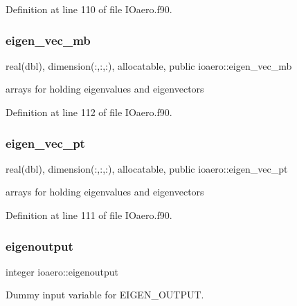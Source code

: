Definition at line 110 of file I\+Oaero.\+f90.

\mbox{\label{namespaceioaero_a0d150f0b81c676515b90fcf83d7ff8c3}} 
\subsubsection{\texorpdfstring{eigen\+\_\+vec\+\_\+mb}{eigen\_vec\_mb}}
{\footnotesize\ttfamily real(dbl), dimension(\+:,\+:,\+:), allocatable, public ioaero\+::eigen\+\_\+vec\+\_\+mb}



arrays for holding eigenvalues and eigenvectors 



Definition at line 112 of file I\+Oaero.\+f90.

\mbox{\label{namespaceioaero_a53e09660909f61713dee3887a3adc1ec}} 
\subsubsection{\texorpdfstring{eigen\+\_\+vec\+\_\+pt}{eigen\_vec\_pt}}
{\footnotesize\ttfamily real(dbl), dimension(\+:,\+:,\+:), allocatable, public ioaero\+::eigen\+\_\+vec\+\_\+pt}



arrays for holding eigenvalues and eigenvectors 



Definition at line 111 of file I\+Oaero.\+f90.

\mbox{\label{namespaceioaero_a8d534ecfa53489b513fc3e339bbfc064}} 
\subsubsection{\texorpdfstring{eigenoutput}{eigenoutput}}
{\footnotesize\ttfamily integer ioaero\+::eigenoutput\hspace{0.3cm}{\ttfamily [private]}}



Dummy input variable for E\+I\+G\+E\+N\+\_\+\+O\+U\+T\+P\+UT. 



